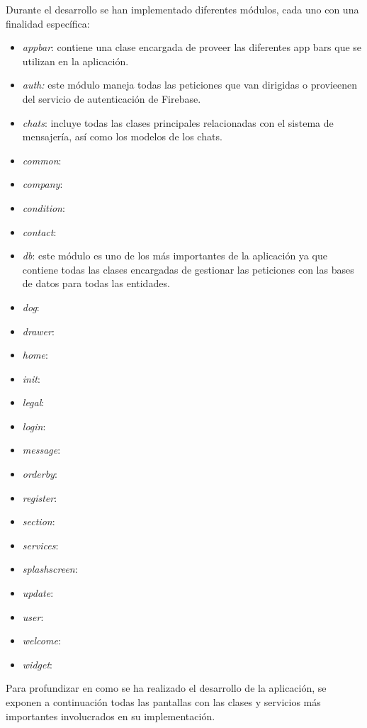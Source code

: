 \documentclass[a4paper, 12pt]{article}
\begin{document}
Durante el desarrollo se han implementado diferentes módulos, cada uno con una finalidad específica:
\begin{itemize}[noitemsep]
	\item \textit{appbar}: contiene una clase encargada de proveer las diferentes app bars que se utilizan en la aplicación.
	\item \textit{auth:} este módulo maneja todas las peticiones que van dirigidas o provieenen del servicio de autenticación de Firebase.
	\item \textit{chats}: incluye todas las clases principales relacionadas con el sistema de mensajería, así como los modelos de los chats.
	\item \textit{common}:
	\item \textit{company}:
	\item \textit{condition}:
	\item \textit{contact}:
	\item \textit{db}: este módulo es uno de los más importantes de la aplicación ya que contiene todas las clases encargadas de gestionar las peticiones con las bases de datos para todas las entidades.
	\item \textit{dog}:
	\item \textit{drawer}:
	\item \textit{home}:
	\item \textit{init}:
	\item \textit{legal}:
	\item \textit{login}:
	\item \textit{message}:
	\item \textit{orderby}:
	\item \textit{register}:
	\item \textit{section}:
	\item \textit{services}:
	\item \textit{splashscreen}:
	\item \textit{update}:
	\item \textit{user}:
	\item \textit{welcome}:
	\item \textit{widget}:
\end{itemize}

Para profundizar en como se ha realizado el desarrollo de la aplicación, se exponen a continuación todas las pantallas con las clases y servicios más importantes involucrados en su implementación.
\end{document}
